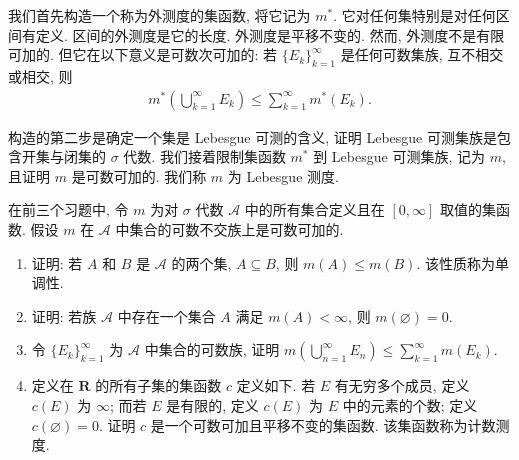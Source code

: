 \documentclass[../../main.tex]{subfiles}
\begin{document}
我们首先构造一个称为外测度的集函数, 将它记为 $m^{*}$. 它对任何集特别是对任何区间有定义. 区间的外测度是它的长度. 外测度是平移不变的. 然而, 外测度不是有限可加的. 但它在以下意义是可数次可加的: 若 $\{E_{k}\}_{k=1}^{\infty}$ 是任何可数集族, 互不相交或相交, 则
\begin{align*}
m^{*}\left(\bigcup_{k=1}^{\infty}E_{k}\right)\leqslant\sum_{k=1}^{\infty}m^{*}(E_{k}).
\end{align*}

构造的第二步是确定一个集是 Lebesgue 可测的含义, 证明 Lebesgue 可测集族是包含开集与闭集的 $\sigma$ 代数. 我们接着限制集函数 $m^{*}$ 到 Lebesgue 可测集族, 记为 $m$, 且证明 $m$ 是可数可加的. 我们称 $m$ 为 Lebesgue 测度.

\begin{exercise}\label{exercise:ch02-01}
在前三个习题中, 令 $m$ 为对 $\sigma$ 代数 $\mathcal{A}$ 中的所有集合定义且在 $[0,\infty]$ 取值的集函数. 假设 $m$ 在 $\mathcal{A}$ 中集合的可数不交族上是可数可加的.
\begin{enumerate}[(1)]
\item 证明: 若 $A$ 和 $B$ 是 $\mathcal{A}$ 的两个集, $A\subseteq B$, 则 $m(A)\leqslant m(B)$. 该性质称为单调性.
\item 证明: 若族 $\mathcal{A}$ 中存在一个集合 $A$ 满足 $m(A)<\infty$, 则 $m(\varnothing)=0$.
\item 令 $\{E_{k}\}_{k=1}^{\infty}$ 为 $\mathcal{A}$ 中集合的可数族, 证明 $m\left(\bigcup_{n=1}^{\infty}E_{n}\right)\leqslant\sum_{k=1}^{\infty}m(E_{k})$.
\item 定义在 $\mathbf{R}$ 的所有子集的集函数 $c$ 定义如下. 若 $E$ 有无穷多个成员, 定义 $c(E)$ 为 $\infty$; 而若 $E$ 是有限的, 定义 $c(E)$ 为 $E$ 中的元素的个数; 定义 $c(\varnothing)=0$. 证明 $c$ 是一个可数可加且平移不变的集函数. 该集函数称为计数测度.
\end{enumerate}
\end{exercise}
\end{document}
